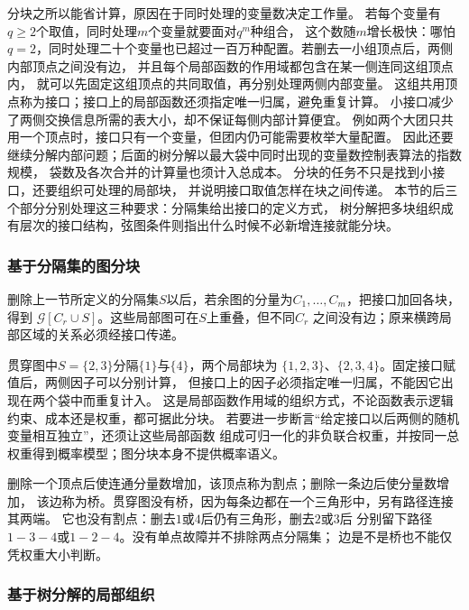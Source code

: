 分块之所以能省计算，原因在于同时处理的变量数决定工作量。
若每个变量有\(q\geq2\)个取值，同时处理\(m\)个变量就要面对\(q^m\)种组合，
这个数随\(m\)增长极快：哪怕\(q=2\)，同时处理二十个变量也已超过一百万种配置。若删去一小组顶点后，两侧内部顶点之间没有边，
并且每个局部函数的作用域都包含在某一侧连同这组顶点内，
就可以先固定这组顶点的共同取值，再分别处理两侧内部变量。
这组共用顶点称为接口；接口上的局部函数还须指定唯一归属，避免重复计算。
小接口减少了两侧交换信息所需的表大小，却不保证每侧内部计算便宜。
例如两个大团只共用一个顶点时，接口只有一个变量，但团内仍可能需要枚举大量配置。
因此还要继续分解内部问题；后面的树分解以最大袋中同时出现的变量数控制表算法的指数规模，
袋数及各次合并的计算量也须计入总成本。
分块的任务不只是找到小接口，还要组织可处理的局部块，
并说明接口取值怎样在块之间传递。
本节的后三个部分分别处理这三种要求：分隔集给出接口的定义方式，
树分解把多块组织成有层次的接口结构，弦图条件则指出什么时候不必新增连接就能分块。

\subsubsection{基于分隔集的图分块}
\label{sec:graph-theory-separators}

删除上一节所定义的分隔集\(S\)以后，若余图的分量为\(C_1,\ldots,C_m\)，把接口加回各块，得到
\(\mathcal G[C_r\cup S]\)。这些局部图可在\(S\)上重叠，但不同\(C_r\)
之间没有边；原来横跨局部区域的关系必须经接口传递。

贯穿图中\(S=\{2,3\}\)分隔\(\{1\}\)与\(\{4\}\)，两个局部块为
\(\{1,2,3\}\)、\(\{2,3,4\}\)。固定接口赋值后，两侧因子可以分别计算，
但接口上的因子必须指定唯一归属，不能因它出现在两个袋中而重复计入。
这是局部函数作用域的组织方式，不论函数表示逻辑约束、成本还是权重，都可据此分块。
若要进一步断言“给定接口以后两侧的随机变量相互独立”，还须让这些局部函数
组成可归一化的非负联合权重，并按同一总权重得到概率模型；图分块本身不提供概率语义。

删除一个顶点后使连通分量数增加，该顶点称为割点；删除一条边后使分量数增加，
该边称为桥。贯穿图没有桥，因为每条边都在一个三角形中，另有路径连接其两端。
它也没有割点：删去\(1\)或\(4\)后仍有三角形，删去\(2\)或\(3\)后
分别留下路径\(1-3-4\)或\(1-2-4\)。没有单点故障并不排除两点分隔集；
边是不是桥也不能仅凭权重大小判断。

\subsubsection{基于树分解的局部组织}
\label{sec:graph-theory-tree-decomposition}

